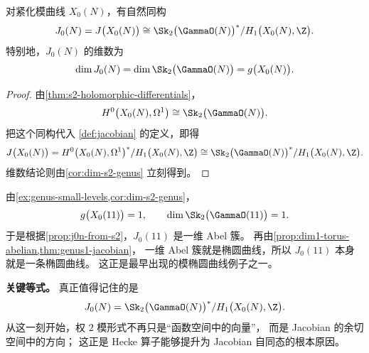 \begin{proposition}
\label{prop:j0n-from-s2}
对紧化模曲线 $X_0(N)$，有自然同构
\[
  J_0(N)=J\bigl(X_0(N)\bigr)
  \cong \Sk_2\bigl(\GammaO(N)\bigr)^*/H_1\bigl(X_0(N),\Z\bigr).
\]
特别地，$J_0(N)$ 的维数为
\[
  \dim J_0(N)=\dim \Sk_2\bigl(\GammaO(N)\bigr)=g\bigl(X_0(N)\bigr).
\]
\end{proposition}

\begin{proof}
由\cref{thm:s2-holomorphic-differentials}，
\[
  H^0\bigl(X_0(N),\Omega^1\bigr)\cong \Sk_2\bigl(\GammaO(N)\bigr).
\]
把这个同构代入 \cref{def:jacobian} 的定义，即得
\[
  J\bigl(X_0(N)\bigr)
  =H^0\bigl(X_0(N),\Omega^1\bigr)^*/H_1\bigl(X_0(N),\Z\bigr)
  \cong \Sk_2\bigl(\GammaO(N)\bigr)^*/H_1\bigl(X_0(N),\Z\bigr).
\]
维数结论则由\cref{cor:dim-s2-genus} 立刻得到。
\end{proof}

\begin{example}[$J_0(11)$ 是一条椭圆曲线]
\label{ex:j011-elliptic}
由\cref{ex:genus-small-levels,cor:dim-s2-genus}，
\[
  g\bigl(X_0(11)\bigr)=1,
  \qquad
  \dim \Sk_2\bigl(\GammaO(11)\bigr)=1.
\]
于是根据\cref{prop:j0n-from-s2}，$J_0(11)$ 是一维 Abel 簇。
再由\cref{prop:dim1-torus-abelian,thm:genus1-jacobian}，
一维 Abel 簇就是椭圆曲线，所以 $J_0(11)$ 本身就是一条椭圆曲线。
这正是最早出现的模椭圆曲线例子之一。
\end{example}

\textbf{关键等式。}
真正值得记住的是
\[
  J_0(N)=\Sk_2\bigl(\GammaO(N)\bigr)^*/H_1\bigl(X_0(N),\Z\bigr).
\]
从这一刻开始，权 $2$ 模形式不再只是“函数空间中的向量”，
而是 Jacobian 的余切空间中的方向；
这正是 Hecke 算子能够提升为 Jacobian 自同态的根本原因。
